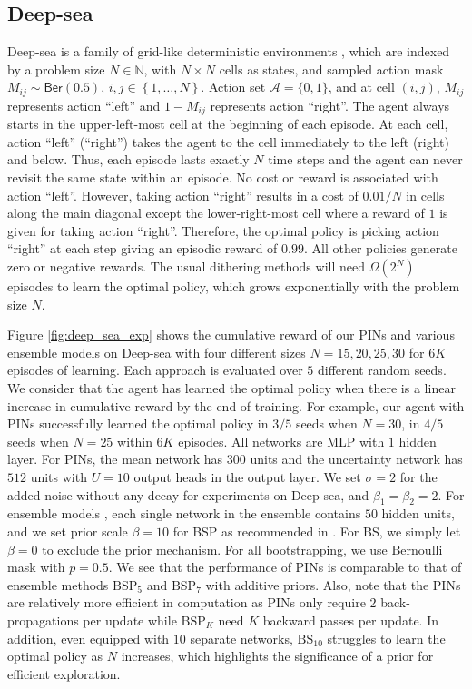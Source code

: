 \documentclass[letterpaper]{article} %
\newcommand{\Sp}[1]{\left(#1\right)}
\newcommand{\Bp}[1]{\left\{#1\right\}}
\theoremstyle{definition}
\begin{document}
\subsection{Deep-sea}
Deep-sea is a family of grid-like deterministic environments \cite{osband2017deep}, which are indexed by a problem size $N \in \mathbb{N}$, with $N \times N$ cells as states, and sampled action mask $M_{ij}\sim\mathsf{Ber}(0.5)$, $i, j\in\Bp{1, \dots, N}$. Action set $\mathcal{A} = \{0, 1\}$, and at cell $\Sp{i, j}$, $M_{ij}$ represents action ``left'' and $1-M_{ij}$ represents action ``right''. The agent always starts in the upper-left-most cell at the beginning of each episode. At each cell, action ``left'' (``right'') takes the agent to the cell immediately to the left (right) and below. Thus, each episode lasts exactly $N$ time steps and the agent can never revisit the same state within an episode. No cost or reward is associated with action ``left''. However, taking action ``right'' results in a cost of $0.01/N$ in cells along the main diagonal except the lower-right-most cell where a reward of $1$ is given for taking action ``right''. Therefore, the optimal policy is picking action ``right'' at each step giving an episodic reward of $0.99$. All other policies generate zero or negative rewards. The usual dithering methods will need $\Omega\Sp{2^N}$ episodes to learn the optimal policy, which grows exponentially with the problem size $N$.

Figure \ref{fig:deep_sea_exp} shows the cumulative reward of our PINs and various ensemble models on Deep-sea with four different sizes $N = 15, 20, 25, 30$ for $6K$ episodes of learning. Each approach is evaluated over $5$ different random seeds. We consider that the agent has learned the optimal policy when there is a linear increase in cumulative reward by the end of training. For example, our agent with PINs successfully learned the optimal policy in $3/5$ seeds when $N = 30$, in $4/5$ seeds when $N = 25$ within $6K$ episodes. All networks are MLP with $1$ hidden layer. For PINs, the mean network has $300$ units and the uncertainty network has $512$ units with $U=10$ output heads in the output layer. We set $\sigma = 2$ for the added noise without any decay for experiments on Deep-sea, and $\beta_1 = \beta_2 = 2$. For ensemble models \cite{osband2018randomized}, each single network in the ensemble contains $50$ hidden units, and we set prior scale $\beta=10$ for BSP as recommended in \cite{osband2018randomized}. For BS, we simply let $\beta=0$ to exclude the prior mechanism. For all bootstrapping, we use Bernoulli mask with $p = 0.5$. We see that the performance of PINs is comparable to that of ensemble methods $\mathrm{BSP}_5$ and $\mathrm{BSP}_7$ with additive priors. Also, note that the PINs are relatively more efficient in computation as PINs only require $2$ back-propagations per update while $\mathrm{BSP}_K$ need $K$ backward passes per update. In addition, even equipped with $10$ separate networks, $\mathrm{BS}_{10}$ struggles to learn the optimal policy as $N$ increases, which highlights the significance of a prior for efficient exploration.
\end{document}

